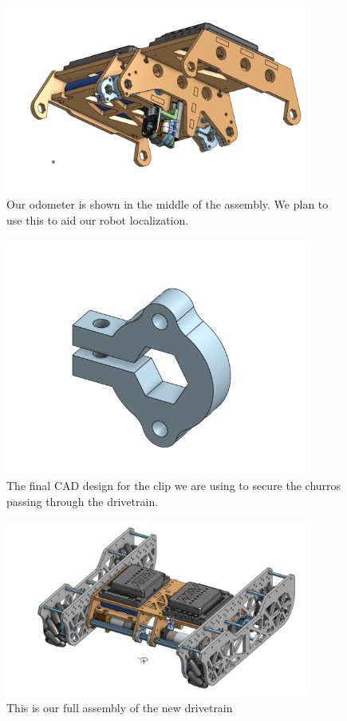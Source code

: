 \begin{figure}[htp]
\centering
\includegraphics[width=0.9\textwidth, angle=0]{Meetings/August/08-08-21/8-8-21_Image4-Odometer - Nathan Forrer.PNG}
\caption{Our odometer is shown in the middle of the assembly. We plan to use this to aid our robot localization.}
\label{fig:pic4}
\end{figure}

\begin{figure}[htp]
\centering
\includegraphics[width=0.9\textwidth, angle=0]{Meetings/August/08-08-21/8-8-21_Image5-Clip - Nathan Forrer.PNG}
\caption{The final CAD design for the clip we are using to secure the churros passing through the drivetrain.}
\label{fig:pic5}
\end{figure}

\begin{figure}[htp]
\centering
\includegraphics[width=0.9\textwidth, angle=0]{Meetings/August/08-08-21/8-8-21_Image6-FullAsm - Nathan Forrer.PNG}
\caption{This is our full assembly of the new drivetrain}
\label{fig:pic6}
\end{figure}